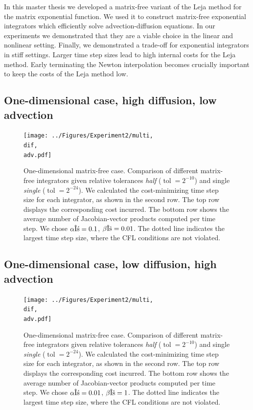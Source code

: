 \documentclass{scrartcl}
\begin{document}
In this master thesis we developed a matrix-free variant of the Leja method for the matrix exponential function. We used it to construct matrix-free exponential integrators which efficiently solve advection-diffusion equations. In our experiments we demonstrated that they are a viable choice in the linear and nonlinear setting.
Finally, we demonstrated a trade-off for exponential integrators in stiff settings. Larger time step sizes lead to high internal costs for the Leja method. Early terminating the Newton interpolation becomes crucially important to keep the costs of the Leja method low.
\newpage

\subsection*{One-dimensional case, high diffusion, low advection}
\begin{figure}[H]
	\newcommand{\dif}{\detokenize{α}=0.1}
	\newcommand{\adv}{\detokenize{β}=0.01}
	\centering
	\texttt{[image: ../Figures/Experiment2/multi, \\dif, \\adv.pdf]}
	\caption{One-dimensional matrix-free case. Comparison of different matrix-free integrators given relative tolerances \textit{half} ($\operatorname{tol} = 2^{-10}$) and single \textit{single} ($\operatorname{tol} = 2^{-24}$). We calculated the cost-minimizing time step size for each integrator, as shown in the second row. The top row displays the corresponding cost incurred. The bottom row shows the average number of Jacobian-vector products computed per time step. We chose $\alpha\dif$, $\beta\adv$. The dotted line indicates the largest time step size, where the CFL conditions are not violated.}
	\label{fig:1DNonlinearHighPe}
\end{figure}

\subsection*{One-dimensional case, low diffusion, high advection}
\begin{figure}[H]
	\newcommand{\dif}{\detokenize{α}=0.01}
	\newcommand{\adv}{\detokenize{β}=1}
	\centering
	\texttt{[image: ../Figures/Experiment2/multi, \\dif, \\adv.pdf]}
	\caption{One-dimensional matrix-free case. Comparison of different matrix-free integrators given relative tolerances \textit{half} ($\operatorname{tol} = 2^{-10}$) and single \textit{single} ($\operatorname{tol} = 2^{-24}$). We calculated the cost-minimizing time step size for each integrator, as shown in the second row. The top row displays the corresponding cost incurred. The bottom row shows the average number of Jacobian-vector products computed per time step. We chose $\alpha\dif$, $\beta\adv$. The dotted line indicates the largest time step size, where the CFL conditions are not violated.}
	\label{fig:1DNonlinearLowPe}
\end{figure}
\end{document}
